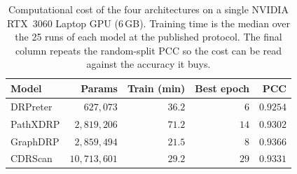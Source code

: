 \begin{table}[!h]
\centering\small
\caption{Computational cost of the four architectures on a single
NVIDIA RTX~3060 Laptop GPU (6\,GB). Training time is the median over
the 25 runs of each model at the published protocol.
The final column
repeats the random-split PCC so the cost can be read against the
accuracy it buys.}
\label{tab:cost}
\begin{tabular*}{\columnwidth}{@{\extracolsep{\fill}}lrrrr@{}}
\toprule
\textbf{Model} & \textbf{Params} & \textbf{Train (min)} & \textbf{Best epoch} & \textbf{PCC} \\
\midrule
DRPreter & $627{,}073$ & $36.2$ & $6$ & $0.9254$ \\
PathXDRP & $2{,}819{,}206$ & $71.2$ & $14$ & $0.9302$ \\
GraphDRP & $2{,}859{,}494$ & $21.5$ & $8$ & $0.9366$ \\
CDRScan & $10{,}713{,}601$ & $29.2$ & $29$ & $0.9331$ \\
\bottomrule
\end{tabular*}
\end{table}
